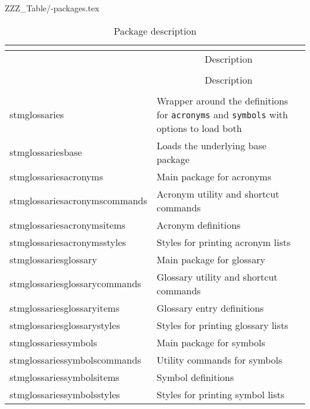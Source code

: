 \documentclass[%
  type=article,%
  layout=koma,%
  hyperref=true,%
  conditionallox=true,%
  conditionalloxnewpage=false,%
  date=true,%
  index=true,%
  listings=true%
]{stmtext}
\newcommand{\tabledirname}{ZZZ_Table}
\newcommand{\tabledir}{\tabledirname/}
\begin{document}
\begin{filecontents}{\tabledir\jobname-packages.tex}
\begin{longtable}{@{}>{\ttfamily}lX@{}}
\caption{Package description}\\
\label{tab:contents:packages}\\
%
\toprule
\multicolumn{1}{c}{Package} & \multicolumn{1}{c}{Description}\\
\midrule
\endfirsthead
\multicolumn{2}{@{}l}{\ldots continued}\\
\toprule
\multicolumn{1}{c}{Package} & \multicolumn{1}{c}{Description}\\
\midrule
\endhead
%
\bottomrule
\multicolumn{2}{r@{}}{continued \ldots}\\
\endfoot
\bottomrule
\endlastfoot
stmglossaries                 & Wrapper around the definitions for \texttt{acronyms} and \texttt{symbols} with options to load both\\
stmglossariesbase             & Loads the underlying base package\\
stmglossariesacronyms         & Main package for acronyms\\
stmglossariesacronymscommands & Acronym utility and shortcut commands\\
stmglossariesacronymsitems    & Acronym definitions\\
stmglossariesacronymsstyles   & Styles for printing acronym lists\\
stmglossariesglossary         & Main package for glossary\\
stmglossariesglossarycommands & Glossary utility and shortcut commands\\
stmglossariesglossaryitems    & Glossary entry definitions\\
stmglossariesglossarystyles   & Styles for printing glossary lists\\
stmglossariessymbols          & Main package for symbols\\
stmglossariessymbolscommands  & Utility commands for symbols\\
stmglossariessymbolsitems     & Symbol definitions\\
stmglossariessymbolsstyles    & Styles for printing symbol lists\\
\end{longtable}
\end{filecontents}
\end{document}
